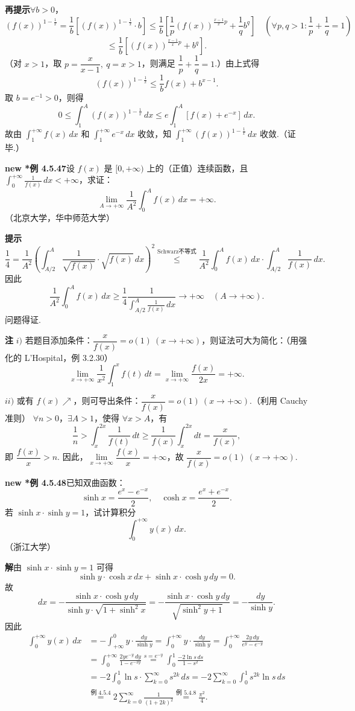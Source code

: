 \documentclass[UTF8,12pt,a4paper,fontset=fandol]{ctexart}
\begin{document}
\noindent\textbf{再提示}\quad $\forall b>0$，
\[
(f(x))^{1-\frac1x}
=\frac1b\left[(f(x))^{1-\frac1x}\cdot b\right]
\le\frac1b\left[\frac1p(f(x))^{\frac{x-1}x p}+\frac1q b^q\right]
\quad\left(\forall p,q>1:\frac1p+\frac1q=1\right)
\]
\[
\le\frac1b\left[(f(x))^{\frac{x-1}x p}+b^q\right].
\]
（对 $x>1$，取 $p=\dfrac x{x-1},\ q=x>1$，则满足 $\dfrac1p+\dfrac1q=1$.）由上式得
\[
(f(x))^{1-\frac1x}\le\frac1b f(x)+b^{x-1}.
\]
取 $b=e^{-1}>0$，则得
\[
0\le\int_1^A(f(x))^{1-\frac1x}\,dx
\le e\int_1^A[f(x)+e^{-x}]\,dx.
\]
故由 $\displaystyle\int_1^{+\infty}f(x)\,dx$ 和 $\displaystyle\int_1^{+\infty}e^{-x}\,dx$ 收敛，知
$\displaystyle\int_1^{+\infty}(f(x))^{1-\frac1x}\,dx$ 收敛.（证毕.）

\noindent\textbf{new *例 4.5.47}\quad 设 $f(x)$ 是 $[0,+\infty)$ 上的（正值）连续函数，且
$\displaystyle\int_0^{+\infty}\frac1{f(x)}\,dx<+\infty$，求证：
\[
\lim_{A\to+\infty}\frac1{A^2}\int_0^A f(x)\,dx=+\infty.
\]
（北京大学，华中师范大学）

\noindent\textbf{提示}\quad
\[
\frac14=\frac1{A^2}\left(\int_{A/2}^A\frac1{\sqrt{f(x)}}\cdot\sqrt{f(x)}\,dx\right)^2
\stackrel{\text{Schwarz不等式}}{\le}
\frac1{A^2}\int_0^A f(x)\,dx\cdot\int_{A/2}^A\frac1{f(x)}\,dx.
\]
因此
\[
\frac1{A^2}\int_0^A f(x)\,dx
\ge\frac14\frac1{\displaystyle\int_{A/2}^A\frac1{f(x)}\,dx}
\to+\infty\quad(A\to+\infty).
\]
问题得证.

\noindent\textbf{注}\quad
$i)$ 若题目添加条件：$\dfrac x{f(x)}=o(1)\ (x\to+\infty)$，则证法可大为简化：（用强化的 L'Hospital，例 3.2.30）
\[
\lim_{x\to+\infty}\frac1{x^2}\int_1^x f(t)\,dt
=\lim_{x\to+\infty}\frac{f(x)}{2x}=+\infty.
\]

$ii)$ 或有 $f(x)\nearrow$，则可导出条件：$\dfrac x{f(x)}=o(1)\ (x\to+\infty)$.（利用 Cauchy 准则）
$\forall n>0$，$\exists A>1$，使得 $\forall x>A$，有
\[
\frac1n>\int_x^{2x}\frac1{f(t)}\,dt
\ge\frac1{f(x)}\int_x^{2x}dt=\frac x{f(x)},
\]
即 $\dfrac{f(x)}x>n$. 因此，$\lim\limits_{x\to+\infty}\dfrac{f(x)}x=+\infty$，故
$\dfrac x{f(x)}=o(1)\ (x\to+\infty)$.

\noindent\textbf{new *例 4.5.48}\quad 已知双曲函数：
\[
\sinh x=\frac{e^x-e^{-x}}2,\quad \cosh x=\frac{e^x+e^{-x}}2.
\]
若 $\sinh x\cdot\sinh y=1$，试计算积分
\[
\int_0^{+\infty}y(x)\,dx.
\]
（浙江大学）

\noindent\textbf{解}\quad 由 $\sinh x\cdot\sinh y=1$ 可得
\[
\sinh y\cdot\cosh x\,dx+\sinh x\cdot\cosh y\,dy=0.
\]
故
\[
dx=-\frac{\sinh x\cdot\cosh y\,dy}{\sinh y\cdot\sqrt{1+\sinh^2x}}
=-\frac{\sinh x\cdot\cosh y\,dy}{\sqrt{\sinh^2y+1}}
=-\frac{dy}{\sinh y}.
\]
因此
\[
\begin{aligned}
\int_0^{+\infty}y(x)\,dx
&=-\int_{+\infty}^0 y\cdot\frac{dy}{\sinh y}
=\int_0^{+\infty}y\cdot\frac{dy}{\sinh y}
=\int_0^{+\infty}\frac{2y\,dy}{e^y-e^{-y}}\\
&=\int_0^{+\infty}\frac{2ye^{-y}\,dy}{1-e^{-2y}}
\stackrel{s=e^{-y}}{=}\int_0^1\frac{-2\ln s\,ds}{1-s^2}\\
&=-2\int_0^1\ln s\cdot\sum_{k=0}^{\infty}s^{2k}\,ds
=-2\sum_{k=0}^{\infty}\int_0^1s^{2k}\ln s\,ds\\
&\stackrel{\text{例 }4.5.4}{=}2\sum_{k=0}^{\infty}\frac1{(1+2k)^2}
\stackrel{\text{例 }5.4.8}{=}\frac{\pi^2}4.
\end{aligned}
\]
\end{document}
